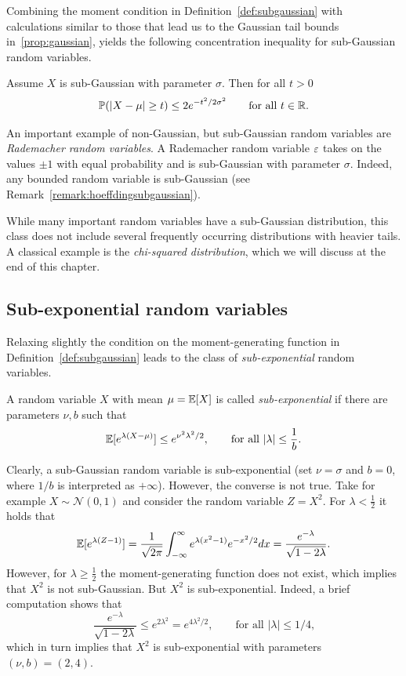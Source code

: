 Combining the moment condition in Definition~\ref{def:subgaussian} with calculations similar to those that lead us to the Gaussian tail bounds in~\ref{prop:gaussian}, yields the following concentration inequality for sub-Gaussian random variables.
\begin{proposition} \label{prop:subgaussian}
Assume $X$ is sub-Gaussian with parameter $\sigma$. Then for all $t>0$
\begin{equation}\label{subgaussiantail}
 \mathbb{P} (|X - \mu| \ge t) \le 2e^{-t^2/2\sigma^2} \qquad \text{for all $t \in \mathbb{R}$.}
\end{equation}
\end{proposition}

An important example of non-Gaussian, but sub-Gaussian random variables are {\em Rademacher random  variables}. A Rademacher random variable  $\varepsilon$ takes on the values $\pm 1$ with equal probability and is sub-Gaussian with parameter $\sigma$. 
Indeed, any bounded random variable is sub-Gaussian (see Remark~\ref{remark:hoeffdingsubgaussian}). 

While many important random variables have a sub-Gaussian distribution, this class does not include several frequently occurring distributions with heavier tails. A classical example is the  {\em chi-squared distribution}, which we will discuss at the end of this chapter.

\subsection{Sub-exponential random variables}

Relaxing slightly the  condition on the moment-generating function in Definition~\ref{def:subgaussian}  leads to the class of {\em sub-exponential} random variables.
\begin{definition}\label{def:subexponential}
A random variable $X$ with mean $\mu = \mathbb{E}[X]$  is called {\em sub-exponential} if there are parameters $\nu, b$ such that
$$\mathbb{E}[e^{\lambda(X-\mu)}] \le e^{\nu^2 \lambda^2/2}, \qquad \text{for all $|\lambda| \le \frac{1}{b}$.}$$
\end{definition}

Clearly, a sub-Gaussian random variable is sub-exponential (set $\nu = \sigma$ and $b=0$, where $1/b$ is interpreted as $+\infty$).
However, the converse is not true. Take for example $X \sim {\mathcal N}(0,1)$ and consider the random variable $Z=X^2$. For $\lambda < \frac{1}{2}$ it holds that
\begin{equation}\label{subexp2}
\mathbb{E} [ e^{\lambda(Z-1)} ] = \frac{1}{\sqrt{2\pi}} \int_{-\infty}^{\infty} e^{\lambda (x^2-1)} e^{-x^2/2} dx = \frac{ e^{-\lambda} }{\sqrt{1-2\lambda}}.
\end{equation}
However, for $\lambda \ge \frac{1}{2}$ the moment-generating function does not exist, which implies that $X^2$ is not sub-Gaussian.
But $X^2$ is sub-exponential. Indeed, a brief computation shows that
$$\frac{ e^{-\lambda} }{\sqrt{1-2\lambda}} \le e^{2\lambda^2} = e^{4\lambda^2/2}, \qquad \text{for all $|\lambda| \le 1/4$,}$$
which in turn implies that $X^2$ is sub-exponential with parameters $(\nu,b)=(2,4)$.


